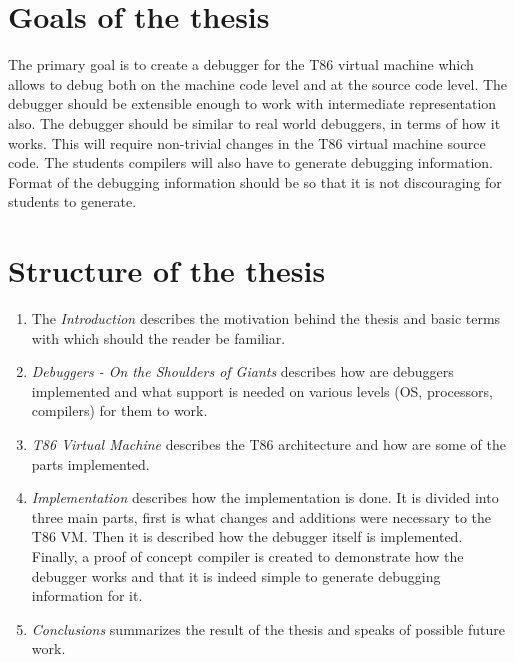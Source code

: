 \section{Goals of the thesis}
The primary goal is to create a debugger for the T86 virtual machine which allows to debug both on the machine code level and at the source code level. The debugger should be extensible enough to work with intermediate representation also. The debugger should be similar to real world debuggers, in terms of how it works. This will require non-trivial changes in the T86 virtual machine source code. The students compilers will also have to generate debugging information. Format of the debugging information should be so that it is not discouraging for students to generate.

\section{Structure of the thesis}
\begin{enumerate}
    \item The \textit{Introduction} describes the motivation behind the thesis and basic terms with which should the reader be familiar.
    \item \textit{Debuggers - On the Shoulders of Giants} describes how are debuggers implemented and what support is needed on various levels (OS, processors, compilers) for them to work.
    \item \textit{T86 Virtual Machine} describes the T86 architecture and how are some of the parts implemented.
    \item \textit{Implementation} describes how the implementation is done. It is divided into three main parts, first is what changes and additions were necessary to the T86 VM. Then it is described how the debugger itself is implemented. Finally, a proof of concept compiler is created to demonstrate how the debugger works and that it is indeed simple to generate debugging information for it.
    \item \textit{Conclusions} summarizes the result of the thesis and speaks of possible future work.
\end{enumerate}

